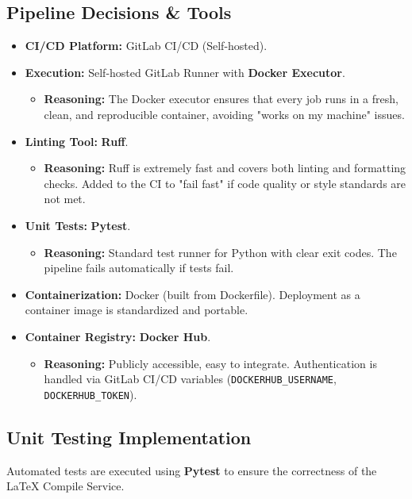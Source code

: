 \documentclass[BMR,Seminar,ngerman,IEEE]{twbook}
\begin{document}
\subsection{Pipeline Decisions \& Tools}
\begin{itemize}
    \item \textbf{CI/CD Platform:} GitLab CI/CD (Self-hosted).
    \item \textbf{Execution:} Self-hosted GitLab Runner with \textbf{Docker Executor}.
        \begin{itemize}
            \item \textbf{Reasoning:} The Docker executor ensures that every job runs in a fresh, clean, and reproducible container, avoiding "works on my machine" issues.
        \end{itemize}
    \item \textbf{Linting Tool:} \textbf{Ruff}.
        \begin{itemize}
            \item \textbf{Reasoning:} Ruff is extremely fast and covers both linting and formatting checks. Added to the CI to "fail fast" if code quality or style standards are not met.
        \end{itemize}
    \item \textbf{Unit Tests:} \textbf{Pytest}.
        \begin{itemize}
            \item \textbf{Reasoning:} Standard test runner for Python with clear exit codes. The pipeline fails automatically if tests fail.
        \end{itemize}
    \item \textbf{Containerization:} Docker (built from Dockerfile). Deployment as a container image is standardized and portable.
    \item \textbf{Container Registry:} \textbf{Docker Hub}.
        \begin{itemize}
            \item \textbf{Reasoning:} Publicly accessible, easy to integrate. Authentication is handled via GitLab CI/CD variables (\texttt{DOCKERHUB\_USERNAME}, \texttt{DOCKERHUB\_TOKEN}).
        \end{itemize}
\end{itemize}

\subsection{Unit Testing Implementation}
Automated tests are executed using \textbf{Pytest} to ensure the correctness of the LaTeX Compile Service.
\end{document}

